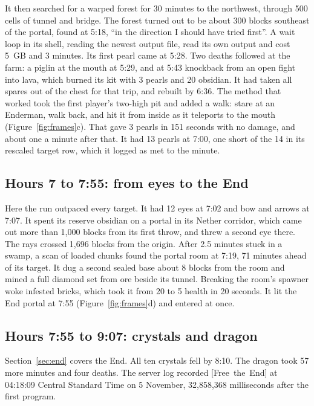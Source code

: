\documentclass[11pt,a4paper]{article}
\newcommand{\adv}[1]{\mbox{\textsf{[#1]}}}
\begin{document}
It then searched for a warped forest for 30 minutes to the northwest, through 500 cells of tunnel and bridge. The forest turned out to be about 300 blocks southeast of the portal, found at 5:18, ``in the direction I should have tried first''. A wait loop in its shell, reading the newest output file, read its own output and cost 5~GB and 3 minutes. Its first pearl came at 5:28. Two deaths followed at the farm: a piglin at the mouth at 5:29, and at 5:43 knockback from an open fight into lava, which burned its kit with 3 pearls and 20 obsidian. It had taken all spares out of the chest for that trip, and rebuilt by 6:36. The method that worked took the first player's two-high pit and added a walk: stare at an Enderman, walk back, and hit it from inside as it teleports to the mouth (Figure~\ref{fig:frames}c). That gave 3 pearls in 151 seconds with no damage, and about one a minute after that. It had 13 pearls at 7:00, one short of the 14 in its rescaled target row, which it logged as met to the minute.

\subsection{Hours 7 to 7:55: from eyes to the End}

Here the run outpaced every target. It had 12 eyes at 7:02 and bow and arrows at 7:07. It spent its reserve obsidian on a portal in its Nether corridor, which came out more than 1,000 blocks from its first throw, and threw a second eye there. The rays crossed 1,696 blocks from the origin. After 2.5 minutes stuck in a swamp, a scan of loaded chunks found the portal room at 7:19, 71 minutes ahead of its target. It dug a second sealed base about 8 blocks from the room and mined a full diamond set from ore beside its tunnel. Breaking the room's spawner woke infested bricks, which took it from 20 to 5 health in 20 seconds. It lit the End portal at 7:55 (Figure~\ref{fig:frames}d) and entered at once.

\subsection{Hours 7:55 to 9:07: crystals and dragon}

Section~\ref{sec:end} covers the End. All ten crystals fell by 8:10. The dragon took 57 more minutes and four deaths. The server log recorded \adv{Free the End} at 04:18:09 Central Standard Time on 5 November, 32,858,368 milliseconds after the first program.
\end{document}
